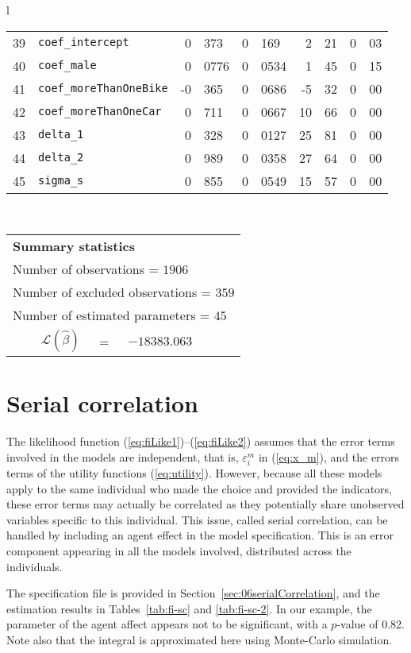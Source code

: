 \documentclass[12pt,a4paper]{article}
\newcommand{\req}[1]{(\ref{#1})}
\begin{document}
\begin{table}[htb]
\begin{tabular}{l}
\begin{tabular}{rlr@{.}lr@{.}lr@{.}lr@{.}l}
39 & \lstinline$coef_intercept$ & 0&373 & 0&169 & 2&21 & 0&03\\
40 & \lstinline$coef_male$ & 0&0776 & 0&0534 & 1&45 & 0&15\\
41 & \lstinline$coef_moreThanOneBike$ & -0&365 & 0&0686 & -5&32 & 0&00\\
42 & \lstinline$coef_moreThanOneCar$ & 0&711 & 0&0667 & 10&66 & 0&00\\
43 & \lstinline$delta_1$ & 0&328 & 0&0127 & 25&81 & 0&00\\
44 & \lstinline$delta_2$ & 0&989 & 0&0358 & 27&64 & 0&00\\
45 & \lstinline$sigma_s$ & 0&855 & 0&0549 & 15&57 & 0&00\\
\hline
\end{tabular}
\\
\begin{tabular}{rcl}
\multicolumn{3}{l}{\bf Summary statistics}\\
\multicolumn{3}{l}{ Number of observations = $1906$} \\
\multicolumn{3}{l}{ Number of excluded observations = $359$} \\
\multicolumn{3}{l}{ Number of estimated  parameters = $45$} \\
 $\mathcal{L}(\hat{\beta})$ &=& $-18383.063 $  \\
\end{tabular}
  \end{tabular}
 \end{table}

\clearpage

\section{Serial correlation}

The likelihood function \req{eq:fiLike1}--\req{eq:fiLike2} assumes
that the error terms involved in the models are independent, that is,
$\varepsilon^{m}_i$ in \req{eq:x_m}, and the errors terms of the utility
functions \req{eq:utility}. However, because all these models apply to
the same individual who made the choice and provided the indicators,
these error terms may actually be correlated as they potentially share
unobserved variables specific to this individual. This issue, called
serial correlation, can be handled by including an agent effect in the
model specification. This is an error component appearing in all the
models involved, distributed across the individuals.

The specification file is provided in
Section~\ref{sec:06serialCorrelation}, and the estimation results in
Tables~\ref{tab:fi-sc} and \ref{tab:fi-sc-2}. In our example, the
parameter of the agent affect appears not to be significant, with a
$p$-value of 0.82. Note also that the integral is approximated here
using Monte-Carlo simulation. 
\end{document}
